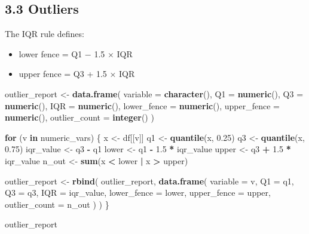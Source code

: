 \documentclass[
]{article}
\newenvironment{Shaded}{\begin{snugshade}}{\end{snugshade}}
\newcommand{\AttributeTok}[1]{\textcolor[rgb]{0.13,0.29,0.53}{#1}}
\newcommand{\ControlFlowTok}[1]{\textcolor[rgb]{0.13,0.29,0.53}{\textbf{#1}}}
\newcommand{\FloatTok}[1]{\textcolor[rgb]{0.00,0.00,0.81}{#1}}
\newcommand{\FunctionTok}[1]{\textcolor[rgb]{0.13,0.29,0.53}{\textbf{#1}}}
\newcommand{\NormalTok}[1]{#1}
\newcommand{\OtherTok}[1]{\textcolor[rgb]{0.56,0.35,0.01}{#1}}
\newcommand{\SpecialCharTok}[1]{\textcolor[rgb]{0.81,0.36,0.00}{\textbf{#1}}}
\providecommand{\tightlist}{%
  \setlength{\itemsep}{0pt}\setlength{\parskip}{0pt}}
\begin{document}
\subsection{3.3 Outliers}\label{outliers}

The IQR rule defines:

\begin{itemize}
\tightlist
\item
  lower fence = Q1 − 1.5 × IQR
\item
  upper fence = Q3 + 1.5 × IQR
\end{itemize}

\begin{Shaded}
\begin{Highlighting}[]
\NormalTok{outlier\_report }\OtherTok{\textless{}{-}} \FunctionTok{data.frame}\NormalTok{(}
  \AttributeTok{variable =} \FunctionTok{character}\NormalTok{(),}
  \AttributeTok{Q1 =} \FunctionTok{numeric}\NormalTok{(),}
  \AttributeTok{Q3 =} \FunctionTok{numeric}\NormalTok{(),}
  \AttributeTok{IQR =} \FunctionTok{numeric}\NormalTok{(),}
  \AttributeTok{lower\_fence =} \FunctionTok{numeric}\NormalTok{(),}
  \AttributeTok{upper\_fence =} \FunctionTok{numeric}\NormalTok{(),}
  \AttributeTok{outlier\_count =} \FunctionTok{integer}\NormalTok{()}
\NormalTok{)}

\ControlFlowTok{for}\NormalTok{ (v }\ControlFlowTok{in}\NormalTok{ numeric\_vars) \{}
\NormalTok{  x }\OtherTok{\textless{}{-}}\NormalTok{ df[[v]]}
\NormalTok{  q1 }\OtherTok{\textless{}{-}} \FunctionTok{quantile}\NormalTok{(x, }\FloatTok{0.25}\NormalTok{)}
\NormalTok{  q3 }\OtherTok{\textless{}{-}} \FunctionTok{quantile}\NormalTok{(x, }\FloatTok{0.75}\NormalTok{)}
\NormalTok{  iqr\_value }\OtherTok{\textless{}{-}}\NormalTok{ q3 }\SpecialCharTok{{-}}\NormalTok{ q1}
\NormalTok{  lower }\OtherTok{\textless{}{-}}\NormalTok{ q1 }\SpecialCharTok{{-}} \FloatTok{1.5} \SpecialCharTok{*}\NormalTok{ iqr\_value}
\NormalTok{  upper }\OtherTok{\textless{}{-}}\NormalTok{ q3 }\SpecialCharTok{+} \FloatTok{1.5} \SpecialCharTok{*}\NormalTok{ iqr\_value}
\NormalTok{  n\_out }\OtherTok{\textless{}{-}} \FunctionTok{sum}\NormalTok{(x }\SpecialCharTok{\textless{}}\NormalTok{ lower }\SpecialCharTok{|}\NormalTok{ x }\SpecialCharTok{\textgreater{}}\NormalTok{ upper)}

\NormalTok{  outlier\_report }\OtherTok{\textless{}{-}} \FunctionTok{rbind}\NormalTok{(}
\NormalTok{    outlier\_report,}
    \FunctionTok{data.frame}\NormalTok{(}
      \AttributeTok{variable =}\NormalTok{ v,}
      \AttributeTok{Q1 =}\NormalTok{ q1,}
      \AttributeTok{Q3 =}\NormalTok{ q3,}
      \AttributeTok{IQR =}\NormalTok{ iqr\_value,}
      \AttributeTok{lower\_fence =}\NormalTok{ lower,}
      \AttributeTok{upper\_fence =}\NormalTok{ upper,}
      \AttributeTok{outlier\_count =}\NormalTok{ n\_out}
\NormalTok{    )}
\NormalTok{  )}
\NormalTok{\}}

\NormalTok{outlier\_report}
\end{Highlighting}
\end{Shaded}
\end{document}
